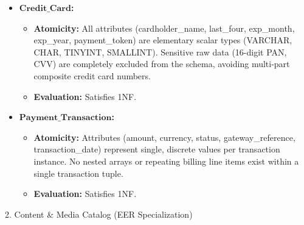 \begin{itemize}
\item
  \(\mathbf{Credit\_\allowbreak{} Card}\)\textbf{:}

  \begin{itemize}
  \item
    \textbf{Atomicity:} All attributes (cardholder\_\allowbreak{}name, last\_\allowbreak{}four, exp\_\allowbreak{}month, exp\_\allowbreak{}year, payment\_\allowbreak{}token) are elementary scalar types (VARCHAR, CHAR, TINYINT, SMALLINT). Sensitive raw data (16-digit PAN, CVV) are completely excluded from the schema, avoiding multi-part composite credit card numbers.
  \item
    \textbf{Evaluation:} Satisfies 1NF.
  \end{itemize}
\item
  \(\mathbf{Payment\_\allowbreak{} Transaction}\)\textbf{:}

  \begin{itemize}
  \item
    \textbf{Atomicity:} Attributes (amount, currency, status, gateway\_\allowbreak{}reference, transaction\_\allowbreak{}date) represent single, discrete values per transaction instance. No nested arrays or repeating billing line items exist within a single transaction tuple.
  \item
    \textbf{Evaluation:} Satisfies 1NF.
  \end{itemize}
\end{itemize}

2. Content \& Media Catalog (EER Specialization)

